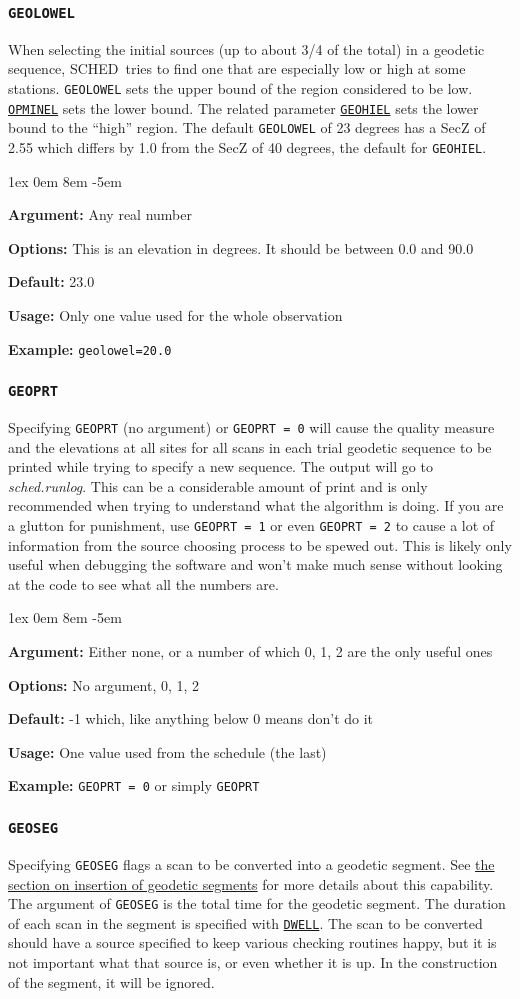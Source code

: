 \documentclass{report}
\newcommand{\schedb}{{\sc SCHED~}}
\newcommand{\rcwbox}[5]{
  \begin{list}{}{\parsep 1ex  \itemsep 0em
                 \leftmargin 8em  \itemindent -5em }
    \item {\bf Argument:} #1
    \item {\bf Options:}  #2
    \item {\bf Default:}  #3
    \item {\bf Usage:}    #4
    \item {\bf Example:}  #5
  \end{list}
}
\begin{document}
\subsubsection{\label{MP:GEOLOWEL}{\tt GEOLOWEL}}

When selecting the initial sources (up to about 3/4 of the total)
in a geodetic sequence, \schedb tries to find one that are especially
low or high at some stations.  {\tt GEOLOWEL} sets the upper bound
of the region considered to be low.  
{\hyperref[MP:OPMINEL]{{\tt OPMINEL}}}
sets the lower bound.  The related parameter
{\hyperref[MP:GEOHIEL]{{\tt GEOHIEL}}} sets the lower bound to the
``high'' region.  The default {\tt GEOLOWEL} of 23 degrees has a
SecZ of 2.55 which differs by 1.0 from the SecZ of 40 degrees, the
default for {\tt GEOHIEL}.

\rcwbox
{Any real number}
{This is an elevation in degrees.  It should be between 0.0 and 90.0}
{23.0}
{Only one value used for the whole observation}
{{\tt geolowel=20.0}}

\subsubsection{\label{MP:GEOPRT}{\tt GEOPRT}}

Specifying {\tt GEOPRT} (no argument) or {\tt GEOPRT = 0}
will cause the quality measure and the elevations at all sites for all
scans in each trial geodetic sequence to be printed while trying to
specify a new sequence.  The output will go to {\sl sched.runlog}. 
This can be a considerable amount of print
and is only recommended when trying to understand what the algorithm
is doing.  If you are a glutton for punishment, use {\tt GEOPRT = 1}
or even {\tt GEOPRT = 2} to cause a lot of information from the source
choosing process to be spewed out.  This is likely only useful when
debugging the software and won't make much sense without looking at
the code to see what all the numbers are.

\rcwbox
{Either none, or a number of which 0, 1, 2 are the only useful ones}
{No argument, 0, 1, 2}
{-1 which, like anything below 0 means don't do it}
{One value used from the schedule (the last)}
{{\tt GEOPRT = 0} or simply {\tt GEOPRT}}


\subsubsection{\label{MP:GEOSEG}{\tt GEOSEG}}

Specifying {\tt GEOSEG} flags a scan to be converted into a geodetic
segment.  See 
{\hyperref[SEC:GEOSEG]{the section on insertion of geodetic segments}}
for more details about this capability.  The argument
of {\tt GEOSEG} is the total time for the geodetic segment.  The duration
of each scan in the segment is specified with 
{\hyperref[MP:DWELL]{{\tt DWELL}}}.
The scan to be converted should have a source specified
to keep various checking routines happy, but it is not important what
that source is, or even whether it is up.  In the construction of the
segment, it will be ignored.
\end{document}
